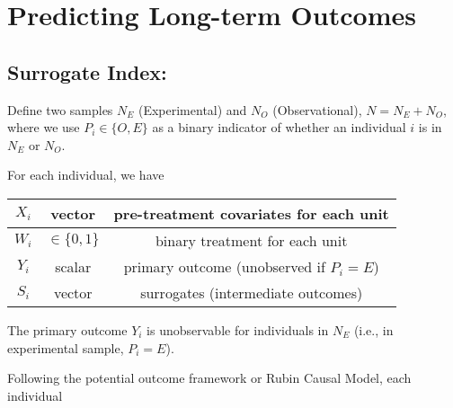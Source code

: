 \chapter{Predicting Long-term Outcomes}
\section{Surrogate Index: \cite{athey2019surrogate}}
Define two samples $N_E$ (Experimental) and $N_O$ (Observational), $N=N_E+N_O$, where we use $P_i\in\{O,E\}$ as a binary indicator of whether an individual $i$ is in $N_E$ or $N_O$.

For each individual, we have
\begin{center}
    \begin{tabular}{ccc}
        \hline
            $X_i$& vector & pre-treatment covariates for each unit\\
        \hline
            $W_i$& $\in\{0,1\}$ & binary treatment for each unit\\
        \hline
            $Y_i$& scalar & primary outcome (unobserved if $P_i=E$)\\
            $S_i$& vector &surrogates (intermediate outcomes)\\
        \hline
    \end{tabular}
\end{center}
The primary outcome $Y_i$ is unobservable for individuals in $N_E$ (i.e., in experimental sample, $P_i=E$).

Following the potential outcome framework or Rubin Causal Model, each individual